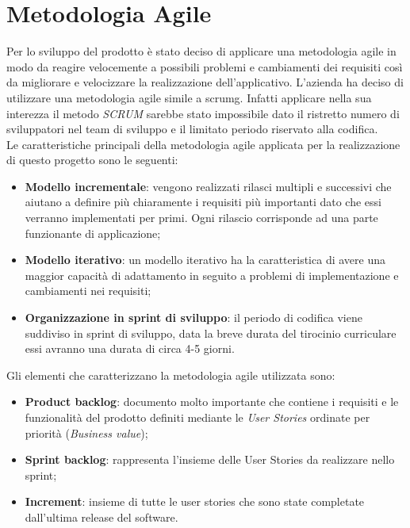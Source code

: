 \section{Metodologia Agile}
Per lo sviluppo del prodotto è stato deciso di applicare una metodologia agile in modo da reagire velocemente a possibili problemi e cambiamenti dei requisiti così da migliorare e velocizzare la realizzazione dell'applicativo. L'azienda ha deciso di utilizzare una metodologia agile simile a \gls{scrumg}. Infatti applicare nella sua interezza il metodo \emph{SCRUM} sarebbe stato impossibile dato il ristretto numero di sviluppatori nel team di sviluppo e il limitato periodo riservato alla codifica. \\
Le caratteristiche principali della metodologia agile applicata per la realizzazione di questo progetto sono le seguenti:
\begin{itemize}
	\item \textbf{Modello incrementale}: vengono realizzati rilasci multipli e successivi che aiutano a definire più chiaramente i requisiti più importanti dato che essi verranno implementati per primi. Ogni rilascio corrisponde ad una parte funzionante di applicazione;
	
	\item \textbf{Modello iterativo}: un modello iterativo ha la caratteristica di avere una maggior capacità di adattamento in seguito a problemi di implementazione e cambiamenti nei requisiti;
	
	\item \textbf{Organizzazione in sprint di sviluppo}: il periodo di codifica viene suddiviso in sprint di sviluppo, data la breve durata del tirocinio curriculare essi avranno una durata di circa 4-5 giorni.
\end{itemize}
\noindent
Gli elementi che caratterizzano la metodologia agile utilizzata sono:
\begin{itemize}
	\item \textbf{Product backlog}: documento molto importante che contiene i requisiti e le funzionalità del prodotto definiti mediante le \emph{User Stories} ordinate per priorità (\emph{Business value});
	
	\item \textbf{Sprint backlog}: rappresenta l'insieme delle User Stories da realizzare nello sprint;
	
	\item \textbf{Increment}: insieme di tutte le user stories che sono state completate dall'ultima release del software.
\end{itemize}
